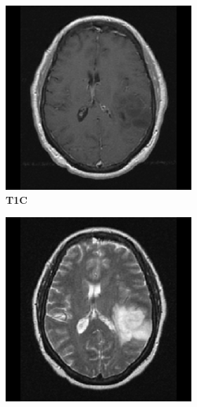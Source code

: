 \begin{subappendices}
\begin{figure}
\begin{subfigure}[b]{0.77\textwidth}
\begin{subfigure}[b]{0.24\textwidth}
        \includegraphics[width=\textwidth]{Figures/TCGA-DU-6400_T1GD.png}
        \caption*{\normalfont \textbf{\acrshort{T1C}}\nopunct}
        \end{subfigure}
        \hfill
        \begin{subfigure}[b]{0.24\textwidth}
        \includegraphics[width=\textwidth]{Figures/TCGA-DU-6400_T2.png}

\end{subfigure}
\end{subfigure}
\end{figure}
\end{subappendices}
